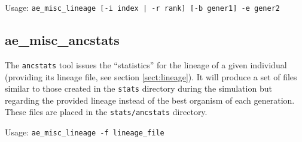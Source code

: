 Usage: \verb?ae_misc_lineage [-i index | -r rank] [-b gener1] -e gener2?

\subsection{ae\_misc\_ancstats}
The \verb?ancstats? tool issues the ``statistics'' for the lineage of a given individual (providing its lineage file, see section \ref{sect:lineage}). It will produce a set of files similar to those created in the \verb?stats? directory during the simulation but regarding the provided lineage instead of the best organism of each generation. These files are placed in the \verb?stats/ancstats? directory.

Usage: \verb?ae_misc_lineage -f lineage_file?


\clearemptydoublepage






